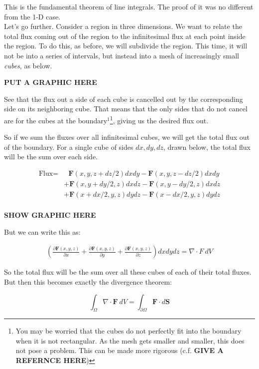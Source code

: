 \documentclass[../master.tex]{subfiles}
\begin{document}
	This is the fundamental theorem of line integrals. The proof of it was no different from the 1-D case.\\
	
	Let's go further. Consider a region in three dimensions. We want to relate the total flux coming out of the region to the infinitesimal flux at each point inside the region. To do this, as before, we will subdivide the region. This time, it will not be into a series of intervals, but instead into a mesh of increasingly small \emph{cubes}, as below.
	
	\textbf{PUT A GRAPHIC HERE}
	
	See that the flux out a side of each cube is cancelled out by the corresponding side on its neighboring cube. That means that the only sides that do not cancel are for the cubes at the boundary$^1$\footnote{You may be worried that the cubes do not perfectly fit into the boundary when it is not rectangular. As the mesh gets smaller and smaller, this does not pose a problem. This can be made more rigorous (c.f. \textbf{GIVE A REFERNCE HERE})}, giving us the desired flux out.
	
	So if we sum the fluxes over all infinitesimal cubes, we will get the total flux out of the boundary. For a single cube of sides $dx,dy,dz$, drawn below, the total flux will be the sum over each side. 
	
	\begin{align*}
		\text{Flux} =&~~~ \mathbf F(x,y,z+dz/2) dx dy - \mathbf F(x,y,z-dz/2) dx dy \\ 
						   & + \mathbf F(x,y+dy/2,z) dx dz - \mathbf F(x,y-dy/2,z) dx dz \\ 
						   & + \mathbf F(x+dx/2,y,z) dy dz - \mathbf F(x-dx/2,y,z) dy dz \\ 
	\end{align*}
	
	\textbf{SHOW GRAPHIC HERE}
	
	But we can write this as: 
	
	\begin{align*}
		\left( \frac{\partial \mathbf F(x,y,z)}{\partial x} + \frac{\partial \mathbf F(x,y,z)}{\partial y} + \frac{\partial \mathbf F(x,y,z)}{\partial z} \right) dx dy dz = \nabla \cdot F ~ dV
	\end{align*}
	
	So the total flux will be the sum over all these cubes of each of their total fluxes. But then this becomes exactly the divergence theorem:
	
	\begin{equation*}
		\int_\Omega \nabla \cdot \mathbf F ~ dV = \int_{\partial \Omega} \mathbf{F} \cdot d \mathbf S
	\end{equation*}
	
\end{document}

